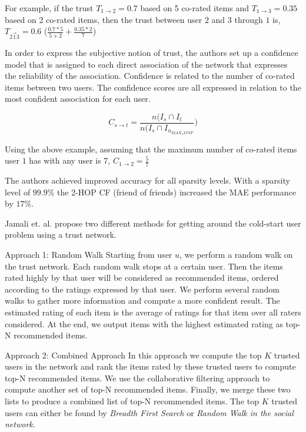 For example, if the trust $T_{1 \rightarrow 2} = 0.7$ based on 5 co-rated items and $T_{1 \rightarrow 3} = 0.35$ based on 2 co-rated items, then the trust between user $2$ and $3$ through $1$ is, $T_{2 \overrightarrow{1} 3} = 0.6$ ($\frac{0.7*5}{5+2} + \frac{0.35*2}{7}$)

In order to express the subjective notion of trust, the authors set up a confidence model that is assigned to each direct association of the network that expresses the reliability of the association. Confidence is related to the number of co-rated items between two users. The confidence scores are all expressed in relation to the most confident association for each user.

\begin{equation}
C_{s \rightarrow t} = \frac{n(I_{s} \cap I_{t}}{n(I_{s} \cap I_{u_{MAX_CONF}}})
\end{equation}

Using the above example, assuming that the maximum number of co-rated items user $1$ has with any user is 7, $C_{1 \rightarrow 2} = \frac{5}{7}$

The authors achieved improved accuracy for all sparsity levels. With a sparsity level of $99.9\%$ the 2-HOP CF (friend of friends) increased the MAE performance by $17\%$.


Jamali et. al. \cite{Jamali2009} propose two different methods for getting around the cold-start user problem using a trust network.

Approach 1: Random Walk
Starting from user $u$, we perform a random walk on the trust network. Each random walk stops at a certain user. Then the items rated highly by that user will be considered as recommended items, ordered according to the ratings expressed by that user. We perform several random walks to gather more information and compute a more confident result. The estimated rating of each item is the average of ratings for that item over all raters considered. At the end, we output items with the highest estimated rating as top-N recommended items.%

Approach 2: Combined Approach
In this approach we compute the top $K$ trusted users in the network and rank the items rated by these trusted users to compute top-N recommended items. We use the collaborative filtering approach to compute another set of top-N recommended items. Finally, we merge these two lists to produce a combined list of top-N recommended items. The top $K$ trusted users can either be found by \emph{Breadth First Search} or \emph{Random Walk in the social network}.%

